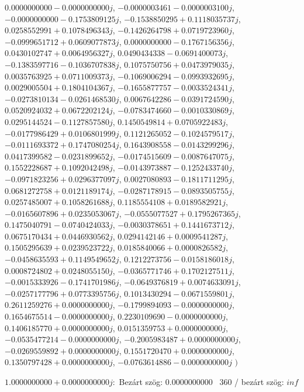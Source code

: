 \documentclass[14pt,a4paper]{article}
\begin{document}
\begin{itemize}
$0.0000000000-0.0000000000j$, $-0.0000003461-0.0000003100j$, $-0.0000000000-0.1753809125j$, $-0.1538850295+0.1118035737j$, $0.0258552991+0.1078496343j$, $-0.1426264798+0.0719723960j$, $-0.0999651712+0.0609077873j$, $0.0000000000-0.1767156356j$, $0.0430102747+0.0064956327j$, $0.0490434338-0.0691400073j$, $-0.1383597716-0.1036707838j$, $0.1075750756+0.0473979035j$, $0.0035763925+0.0711009373j$, $-0.1069006294-0.0993932695j$, $0.0029005504+0.1804104367j$, $-0.1655877757-0.0033524341j$, $-0.0273810134-0.0261468530j$, $0.0067642286-0.0391724590j$, $0.0520924032+0.0672202124j$, $-0.0783474660-0.0010330869j$, $0.0295144524-0.1127857580j$, $0.1450549814+0.0705922483j$, $-0.0177986429+0.0106801999j$, $0.1121265052-0.1024579517j$, $-0.0111693372+0.1747080254j$, $0.1643908558-0.0143299296j$, $0.0417399582-0.0231899652j$, $-0.0174515609-0.0087647075j$, $0.1552228687+0.1092042498j$, $-0.0143973887-0.1252433740j$, $-0.0971823256+0.0296377097j$, $0.0027080893-0.1811711295j$, $0.0681272758+0.0121189174j$, $-0.0287178915-0.0893505755j$, $0.0257485007+0.1058261688j$, $0.1185554108+0.0189582921j$, $-0.0165607896+0.0235053067j$, $-0.0555077527+0.1795267365j$, $0.1475040791-0.0740424033j$, $-0.0030378651+0.1441673712j$, $0.0675170434+0.0446930562j$, $0.0294142146+0.0009541287j$, $0.1505295639+0.0239523722j$, $0.0185840066+0.0000826582j$, $-0.0458635593+0.1149549652j$, $0.1212273756-0.0158186018j$, $0.0008724802+0.0248055150j$, $-0.0365771746+0.1702127511j$, $-0.0015333926-0.1741701986j$, $-0.0649376819+0.0074633091j$, $-0.0257177796+0.0773395756j$, $0.1013430294-0.0671559801j$, $0.2611259276+0.0000000000j$, $-0.1799894093-0.0000000000j$, $0.1654675514-0.0000000000j$, $0.2230109690-0.0000000000j$, $0.1406185770+0.0000000000j$, $0.0151359753+0.0000000000j$, $-0.0535477214-0.0000000000j$, $-0.2005983487+0.0000000000j$, $-0.0269559892+0.0000000000j$, $0.1551720470+0.0000000000j$, $0.1350797428+0.0000000000j$, $-0.0763614886-0.0000000000j$
$\big)$
\end{itemize}
$1.0000000000+0.0000000000j$:\
Bezárt szög: $0.0000000000$ \
360 / bezárt szög: $inf$\
\end{document}
